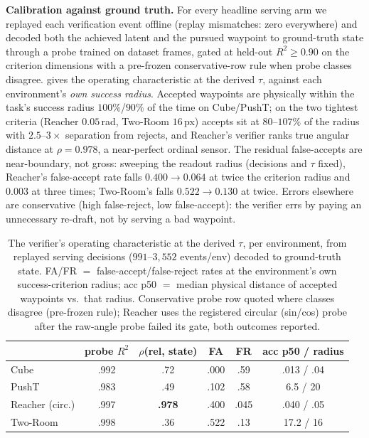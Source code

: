 \documentclass{article}
\begin{document}
\textbf{Calibration against ground truth.} For every headline serving arm we
replayed each verification event offline (replay mismatches: zero everywhere) and
decoded both the achieved latent and the pursued waypoint to ground-truth state
through a probe trained on dataset frames, gated at held-out $R^{2}\geq0.90$ on the
criterion dimensions with a pre-frozen conservative-row rule when probe classes
disagree.  gives the operating characteristic at the derived
$\tau$, against each environment's \emph{own success radius}. Accepted waypoints are
physically within the task's success radius $100\%$/$90\%$ of the time on
Cube/PushT; on the two tightest criteria (Reacher $0.05$\,rad, Two-Room $16$\,px)
accepts sit at $80$--$107\%$ of the radius with $2.5$--$3\times$ separation from
rejects, and Reacher's verifier ranks true angular distance at $\rho=0.978$, a
near-perfect ordinal sensor. The residual false-accepts are near-boundary, not
gross: sweeping the readout radius (decisions and $\tau$ fixed), Reacher's
false-accept rate falls $0.400\to0.064$ at twice the criterion radius and $0.003$
at three times; Two-Room's falls $0.522\to0.130$ at twice. Errors elsewhere are
conservative (high false-reject, low false-accept): the verifier errs by paying an
unnecessary re-draft, not by serving a bad waypoint.

\begin{table}[h]
\centering
\small
\caption{The verifier's operating characteristic at the derived $\tau$, per
environment, from replayed serving decisions ($991$--$3{,}552$ events/env) decoded
to ground-truth state. FA/FR $=$ false-accept/false-reject rates at the
environment's own success-criterion radius; acc p50 $=$ median physical distance of
accepted waypoints vs.\ that radius. Conservative probe row quoted where classes
disagree (pre-frozen rule); Reacher uses the registered circular (sin/cos) probe
after the raw-angle probe failed its gate, both outcomes reported.}
\label{tab:calibration}
\begin{tabular}{lccccc}
\toprule
& probe $R^{2}$ & $\rho$(rel, state) & FA & FR & acc p50 / radius \\
\midrule
Cube & .992 & .72 & .000 & .59 & .013 / .04 \\
PushT & .983 & .49 & .102 & .58 & 6.5 / 20 \\
Reacher (circ.) & .997 & \textbf{.978} & .400 & .045 & .040 / .05 \\
Two-Room & .998 & .36 & .522 & .13 & 17.2 / 16 \\
\bottomrule
\end{tabular}
\end{table}
\end{document}

